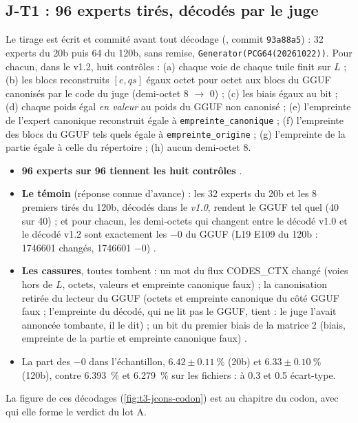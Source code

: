 \subsection{J-T1 : 96 experts tirés, décodés par le juge}\label{t3jug:sec:jt1}

Le tirage est écrit et commité avant tout décodage (, commit \texttt{93a88a5}) : 32 experts du 20b puis 64 du 120b, sans remise, \texttt{Generator(PCG64(20261022))}. Pour chacun, dans le v1.2, huit contrôles : (a) chaque voie de chaque tuile finit sur $L$ ; (b) les blocs reconstruits $[e, qs]$ égaux octet pour octet aux blocs du GGUF canonisés par le code du juge (demi-octet 8 $\to$ 0) ; (c) les biais égaux au bit ; (d) chaque poids égal \emph{en valeur} au poids du GGUF non canonisé ; (e) l'empreinte de l'expert canonique reconstruit égale à \texttt{empreinte\_canonique} ; (f) l'empreinte des blocs du GGUF tels quels égale à \texttt{empreinte\_origine} ; (g) l'empreinte de la partie égale à celle du répertoire ; (h) aucun demi-octet 8.

\begin{itemize}
\item \textbf{96 experts sur 96 tiennent les huit contrôles} \mes.
\item \textbf{Le témoin} (réponse connue d'avance) : les 32 experts du 20b et les 8 premiers tirés du 120b, décodés dans le \emph{v1.0}, rendent le GGUF tel quel (40 sur 40) ; et pour chacun, les demi-octets qui changent entre le décodé v1.0 et le décodé v1.2 sont exactement les $-0$ du GGUF (L19 E109 du 120b : \num{1746601} changés, \num{1746601} $-0$) \mes.
\item \textbf{Les cassures}, toutes tombent : un mot du flux CODES\_CTX changé (voies hors de $L$, octets, valeurs et empreinte canonique faux) ; la canonisation retirée du lecteur du GGUF (octets et empreinte canonique du côté GGUF faux ; l'empreinte du décodé, qui ne lit pas le GGUF, tient : le juge l'avait annoncée tombante, il le dit) ; un bit du premier biais de la matrice 2 (biais, empreinte de la partie et empreinte canonique faux) \mes.
\item La part des $-0$ dans l'échantillon, $\num{6.42} \pm \SI{0.11}{\percent}$ (20b) et $\num{6.33} \pm \SI{0.10}{\percent}$ (120b), contre \SI{6.393}{\percent} et \SI{6.279}{\percent} sur les fichiers : à \num{0.3} et \num{0.5} écart-type.
\end{itemize}
La figure de ces décodages (\cref{fig:t3-jcons-codon}) est au chapitre du codon, avec qui elle forme le verdict du lot A.

